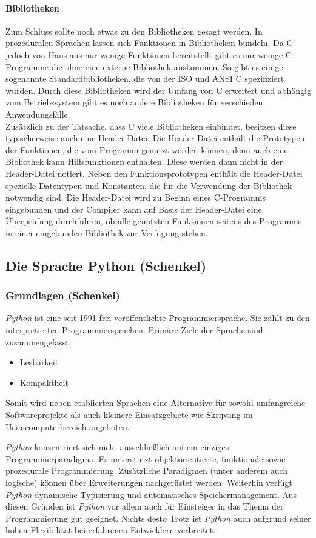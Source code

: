   \paragraph{Bibliotheken}
  Zum Schluss sollte noch etwas zu den Bibliotheken gesagt werden. In prozeduralen Sprachen lassen sich
  Funktionen in Bibliotheken bündeln. Da C jedoch von Haus aus nur wenige Funktionen bereitstellt gibt es
  nur wenige C-Programme die ohne eine externe Bibliothek auskommen. So gibt es einige sogenannte
  Standardbibliotheken, die von der ISO und ANSI C spezifiziert wurden. Durch diese
  Bibliotheken wird der Umfang von C erweitert und abhängig vom Betriebssystem gibt es noch andere
  Bibliotheken für verschieden Anwendungsfälle. \\
  Zusätzlich zu der Tatsache, dass C viele Bibliotheken einbindet, besitzen diese typischerweise auch
  eine Header-Datei. Die Header-Datei enthält die Prototypen der Funktionen, die vom Programm genutzt
  werden können, denn auch eine Bibliothek kann Hilfsfunktionen enthalten. Diese werden dann nicht in
  der Header-Datei notiert. Neben den Funktionsprototypen enthält die Header-Datei spezielle
  Datentypen und Konstanten, die für die Verwendung der Bibliothek notwendig sind. Die Header-Datei wird
  zu Beginn eines C-Programms eingebunden und der Compiler kann auf Basis der Header-Datei eine Überprüfung
  durchführen, ob alle genutzten Funktionen seitens des Programms in einer eingebunden Bibliothek zur
  Verfügung stehen.

\subsection{Die Sprache Python (Schenkel)}
\subsubsection{Grundlagen (Schenkel)}
\textit{Python} ist eine seit 1991 frei veröffentlichte Programmiersprache. Sie zählt
zu den interpretierten Programmiersprachen. Primäre Ziele der Sprache sind zusammengefasst:
\begin{itemize}
\item Lesbarkeit
\item Kompaktheit
\end{itemize}
Somit wird neben etablierten Sprachen eine Alternative für sowohl umfangreiche Softwareprojekte
als auch kleinere Einsatzgebiete wie Skripting im Heimcomputerbereich angeboten.

\textit{Python} konzentriert sich nicht ausschließlich auf ein einziges Programmierparadigma.
Es unterstützt objektorientierte, funktionale sowie prozedurale Programmierung. Zusätzliche
Paradigmen (unter anderem auch logische) können über Erweiterungen nachgerüstet werden.
Weiterhin verfügt \textit{Python} dynamische Typisierung und automatisches Speichermanagement. Aus
diesen Gründen ist \textit{Python} vor allem auch für Einsteiger in das Thema der Programmierung
gut geeignet. Nichts desto Trotz ist \textit{Python} auch aufgrund seiner hohen Flexibilität
bei erfahrenen Entwicklern verbreitet.

